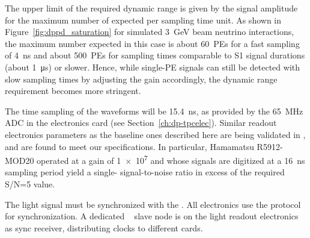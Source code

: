 
The upper limit of the required dynamic range is given by the  signal amplitude for the maximum number of  expected per sampling time unit. As shown in Figure~\ref{fig:dppd_saturation} for simulated \SI{3}{GeV} beam neutrino interactions, the maximum number expected in this case is about \SI{60}{PEs} for a fast sampling of \SI{4}{ns} and about \SI{500}{PEs} for sampling times comparable to S1 signal durations (about \SI{1}{\micro\second}) or slower. Hence, while single-PE signals can  still be detected with slow sampling times by adjusting the  gain accordingly, the dynamic range requirement becomes more stringent. 

The time sampling of the  waveforms will be \SI{15.4}{ns}, as provided by the \SI{65}{MHz} ADC in the  electronics card (see Section~\ref{ch:dp-tpcelec}). Similar readout electronics parameters as the baseline ones described here are being validated in , and are found to meet our specifications. In particular, Hamamatsu R5912-MOD20  operated at a gain of \num{1e7} and whose signals are digitized at a \SI{16}{ns} sampling period yield a single- signal-to-noise ratio in excess of the required S/N=5 value.



The light signal must be synchronized with the . All  electronics use the  protocol for synchronization. A dedicated  ~\cite{utca} slave node is on the light readout  electronics as sync receiver, distributing clocks to different  cards.

